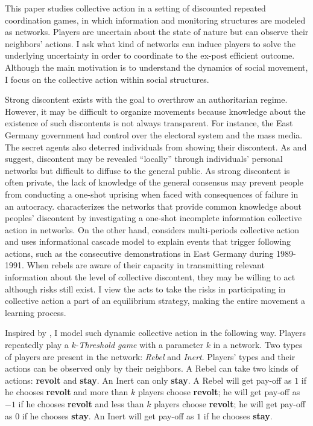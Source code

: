 \documentclass[12pt,letterpaper]{article}
\theoremstyle{definition}
\theoremstyle{remark}
\theoremstyle{claim}
\begin{document}
This paper studies collective action in a setting of discounted repeated coordination games, in which information and monitoring structures are modeled as networks. Players are uncertain about the state of nature but can observe their neighbors' actions. I ask what kind of networks can induce players to solve the underlying uncertainty in order to coordinate to the ex-post efficient outcome. Although the main motivation is to understand the dynamics of social movement, I focus on the collective action within social structures.

Strong discontent exists with the goal to overthrow an authoritarian regime. However, it may be difficult to organize movements because knowledge about the existence of such discontents is not always transparent. For instance, the East Germany government had control over the electoral system and the mass media. The secret agents also deterred individuals from showing their discontent. As \citep{Karl-Dieter1993} and \citep{Chwe2000} suggest, discontent may be revealed ``locally'' through individuals' personal networks but difficult to diffuse to the general public. As strong discontent is often private, the lack of knowledge of the general consensus may prevent people from conducting a one-shot uprising when faced with consequences of failure in an autocracy. \citep{Chwe2000} characterizes the networks that provide common knowledge about peoples' discontent by investigating a one-shot incomplete information collective action in networks. On the other hand, \citep{Lohmann2011} considers multi-periods collective action and uses informational cascade model to explain events that trigger following actions, such as the consecutive demonstrations in East Germany during 1989-1991. When rebels are aware of their capacity in transmitting relevant information about the level of collective discontent, they may be willing to act although risks still exist. I view the acts to take the risks in participating in collective action a part of an equilibrium strategy, making the entire movement a learning process.


Inspired by \citep{Chwe2000}, I model such dynamic collective action in the following way. Players repeatedly play a $k$-\textit{Threshold game} with a parameter $k$ in a network. Two types of players are present in the network: \textit{Rebel} and \textit{Inert}.  Players' types and their actions can be observed only by their neighbors. A Rebel can take two kinds of actions: \textbf{revolt} and \textbf{stay}. An Inert can only \textbf{stay}. A Rebel will get pay-off as $1$ if he chooses \textbf{revolt} and more than $k$ players choose \textbf{revolt}; he will get pay-off as $-1$ if he chooses \textbf{revolt} and less than $k$ players choose \textbf{revolt}; he will get pay-off as $0$ if he chooses \textbf{stay}. An Inert will get pay-off as $1$ if he chooses \textbf{stay}.
\end{document}
